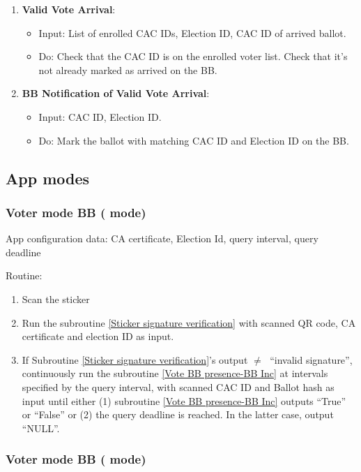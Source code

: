 \documentclass{article}
\begin{document}
\begin{enumerate}
    \item \textbf{Valid Vote Arrival}:
\begin{itemize}
    \item Input: List of enrolled CAC IDs, Election ID, CAC ID of arrived ballot.
    \item Do: Check that the CAC ID is on the enrolled voter list.
    Check that it's not already marked as arrived on the BB.
\end{itemize}
\label{Valid Vote Arrival}
    \item \textbf{BB Notification of Valid Vote Arrival}:
\begin{itemize}
    \item Input: CAC ID, Election ID.
    \item Do: Mark the ballot with matching CAC ID and Election ID on the BB.

\end{itemize}
\label{BB Notification of Valid Vote Arrival}
\end{enumerate}

    

\subsection{App modes}
\subsubsection{Voter mode BB (\BBInclusionCheck{} mode) }
App configuration data: CA certificate, Election Id, query interval, query deadline


Routine:
\begin{enumerate}
    \item Scan the sticker
    \item Run the subroutine \ref{Sticker signature verification} with scanned QR code, CA certificate and election ID as input.
    \item If Subroutine \ref{Sticker signature verification}'s output $\neq\;$ ``invalid signature'', continuously run the subroutine \ref{Vote BB presence-BB Inc} at intervals specified by the query interval, with scanned CAC ID and Ballot hash as input until either (1) subroutine \ref{Vote BB presence-BB Inc} outputs ``True'' or ``False'' or (2) the query deadline is reached. In the latter case, output ``NULL''.
    
\end{enumerate}

\subsubsection{Voter mode BB (\StickerBBUpload{}{} mode) }
\end{document}
